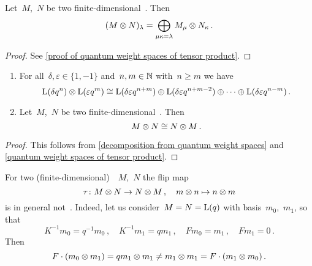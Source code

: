 \documentclass[a4paper, 11pt, oneside]{scrartcl}
\begin{document}
\begin{lemma}
  \label{quantum weight spaces of tensor product}
  Let~$M$,~$N$ be two finite-dimensional~.
  Then
  \[
    (M \otimes N)_\lambda
    =
    \bigoplus_{\mu \kappa = \lambda}
    M_\mu \otimes N_\kappa \,.
  \]
\end{lemma}

\begin{proof}
  See \cref{proof of quantum weight spaces of tensor product}.
\end{proof}

\begin{proposition}
  \leavevmode
  \begin{enumerate}
    \item
      For all~$\delta, \varepsilon \in \{1, -1\}$ and~$n, m \in \mathbb{N}$ with~$n \geq m$ we have
      \[
        \operatorname{L}(\delta q^n) \otimes \operatorname{L}(\varepsilon q^m)
        \cong
        \operatorname{L}(\delta \varepsilon q^{n+m})
        \oplus
        \operatorname{L}(\delta \varepsilon q^{n+m-2})
        \oplus
        \dotsb
        \oplus
        \operatorname{L}(\delta \varepsilon q^{n-m}) \,.
      \]
    \item
      Let~$M$,~$N$ be two finite-dimensional~.
      Then
      \[
        M \otimes N
        \cong
        N \otimes M \,.
      \]
  \end{enumerate}
\end{proposition}

\begin{proof}
  This follows from \cref{decomposition from quantum weight spaces} and \cref{quantum weight spaces of tensor product}.
\end{proof}

\begin{warning}
  For two (finite-dimensional)~~$M$,~$N$ the flip map
  \[
    \tau
    \colon
    M \otimes N
    \to
    N \otimes M \,,
    \quad
    m \otimes n
    \mapsto
    n \otimes m
  \]
  is in general not~.
  Indeed, let us consider~$M = N = \operatorname{L}(q)$ with basis~$m_0$,~$m_1$, so that
  \[
    K^{-1} m_0 = q^{-1} m_0 \,,
    \quad
    K^{-1} m_1 = q m_1 \,,
    \quad
    F m_0 = m_1 \,,
    \quad
    F m_1 = 0 \,.
  \]
  Then
  \[
    F \cdot (m_0 \otimes m_1)
    =
    q m_1 \otimes m_1
    \neq
    m_1 \otimes m_1
    =
    F \cdot (m_1 \otimes m_0) \,.
  \]
\end{warning}
\end{document}
